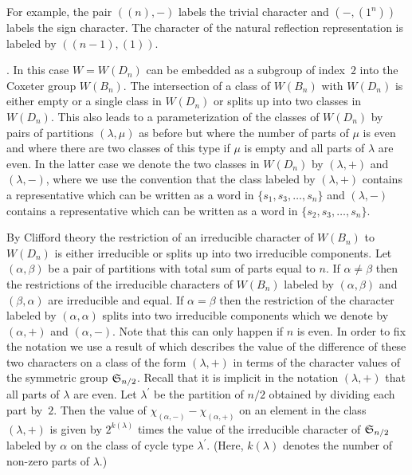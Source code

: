For  example,  the  pair  $((n),-)$ labels  the  trivial  character  and
$(-,(1^n))$  labels the  sign character.  The character  of the  natural
reflection representation is labeled by $((n-1),(1))$.

\smallskip
{}. In this  case $W=W(D_n)$ can be
embedded as a subgroup of index~$2$ into the Coxeter group $W(B_n)$. The
intersection of a  class of $W(B_n)$ with $W(D_n)$ is  either empty or a
single class in $W(D_n)$ or splits up into two classes in $W(D_n)$. This
also leads to a parameterization of  the classes of $W(D_n)$ by pairs of
partitions $(\lambda,\mu)$  as before but  where the number of  parts of
$\mu$  is  even  and  where  there  are two  classes  of  this  type  if
$\mu$  is empty  and all  parts  of $\lambda$  are even.  In the  latter
case  we  denote  the  two  classes in  $W(D_n)$  by  $(\lambda,+)$  and
$(\lambda,-)$, where  we use  the convention that  the class  labeled by
$(\lambda,+)$ contains a  representative which can be written  as a word
in $\{s_1,s_3,\ldots,s_n\}$ and  $(\lambda,-)$ contains a representative
which can be written as a word in $\{s_2,s_3, \ldots,s_n\}$.

By  Clifford theory the restriction of an irreducible character of $W(B_n)$
to  $W(D_n)$  is  either  irreducible  or  splits  up  into two irreducible
components.  Let $(\alpha,\beta)$ be a pair of partitions with total sum of
parts  equal to $n$.  If $\alpha \neq  \beta$ then the  restrictions of the
irreducible characters of $W(B_n)$ labeled by $(\alpha,\beta)$ and $(\beta,
\alpha)$  are irreducible and equal. If $\alpha=\beta$ then the restriction
of  the character labeled by  $(\alpha,\alpha)$ splits into two irreducible
components which we denote by $(\alpha,+)$ and $(\alpha,-)$. Note that this
can  only happen  if $n$  is even.  In order  to fix  the notation we use a
result of \cite{Ste89} which describes the value of the difference of these
two  characters  on  a  class  of  the  form  $(\lambda,+)$ in terms of the
character  values of  the symmetric  group ${\mathfrak S}_{n/2}$.  Recall that it is
implicit  in the  notation $(\lambda,+)$  that all  parts of  $\lambda$ are
even.  Let $\lambda^\prime$ be the partition  of $n/2$ obtained by dividing
each  part by~$2$. Then  the value of $\chi_{(\alpha,-)}-\chi_{(\alpha,+)}$
on an element in the class $(\lambda,+)$ is given by $2^{k(\lambda)}$ times
the  value of the irreducible character of ${\mathfrak S}_{n/2}$ labeled by $\alpha$
on  the class of  cycle type $\lambda^\prime$.  (Here, $k(\lambda)$ denotes
the number of non-zero parts of $\lambda$.)

